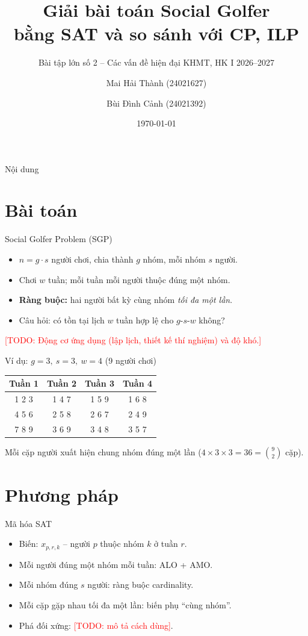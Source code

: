 \documentclass[aspectratio=169,11pt]{beamer}
\title{Giải bài toán Social Golfer\\bằng SAT và so sánh với CP, ILP}
\subtitle{Bài tập lớn số 2 -- Các vấn đề hiện đại KHMT, HK I 2026--2027}
\author{Mai Hải Thành (24021627) \and Bùi Đình Cảnh (24021392)}
\institute{Trường Đại học Công nghệ, Đại học Quốc gia Hà Nội}
\date{\today}
\newcommand{\TODO}[1]{\textcolor{red}{[TODO: #1]}}
\begin{document}
\begin{frame}[plain]
  \titlepage
\end{frame}

\begin{frame}{Nội dung}
  \tableofcontents
\end{frame}

\section{Bài toán}
\begin{frame}{Social Golfer Problem (SGP)}
  \begin{itemize}
    \item $n = g\cdot s$ người chơi, chia thành $g$ nhóm, mỗi nhóm $s$ người.
    \item Chơi $w$ tuần; mỗi tuần mỗi người thuộc đúng một nhóm.
    \item \textbf{Ràng buộc:} hai người bất kỳ cùng nhóm \emph{tối đa một lần}.
    \item Câu hỏi: có tồn tại lịch $w$ tuần hợp lệ cho $g$-$s$-$w$ không?
  \end{itemize}
  \vspace{0.5em}
  \TODO{Động cơ ứng dụng (lập lịch, thiết kế thí nghiệm) và độ khó.}
\end{frame}

\begin{frame}{Ví dụ: $g=3,\ s=3,\ w=4$ (9 người chơi)}
  \centering
  \begin{tabular}{cccc}
    \toprule
    Tuần 1 & Tuần 2 & Tuần 3 & Tuần 4 \\
    \midrule
    1 2 3 & 1 4 7 & 1 5 9 & 1 6 8 \\
    4 5 6 & 2 5 8 & 2 6 7 & 2 4 9 \\
    7 8 9 & 3 6 9 & 3 4 8 & 3 5 7 \\
    \bottomrule
  \end{tabular}

  \vspace{0.8em}
  Mỗi cặp người xuất hiện chung nhóm đúng một lần
  ($4\times 3\times 3 = 36 = \binom{9}{2}$ cặp).
\end{frame}

\section{Phương pháp}
\begin{frame}{Mã hóa SAT}
  \begin{itemize}
    \item Biến: $x_{p,r,k}$ -- người $p$ thuộc nhóm $k$ ở tuần $r$.
    \item Mỗi người đúng một nhóm mỗi tuần: ALO + AMO.
    \item Mỗi nhóm đúng $s$ người: ràng buộc cardinality.
    \item Mỗi cặp gặp nhau tối đa một lần: biến phụ ``cùng nhóm''.
    \item Phá đối xứng: \TODO{mô tả cách dùng}.
  \end{itemize}
\end{frame}
\end{document}
